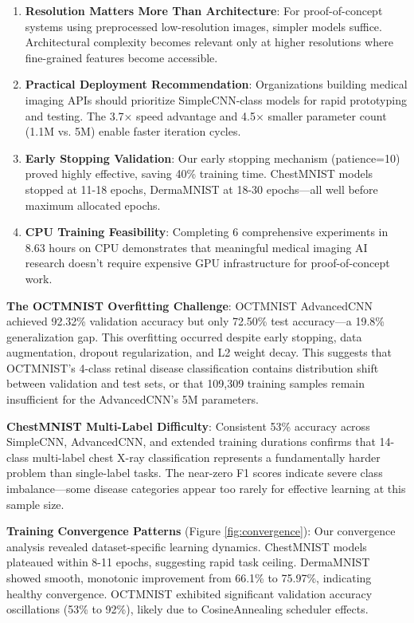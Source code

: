 \documentclass[12pt,a4paper]{article}
\begin{document}
\begin{enumerate}
    \item \textbf{Resolution Matters More Than Architecture}: For proof-of-concept systems using preprocessed low-resolution images, simpler models suffice. Architectural complexity becomes relevant only at higher resolutions where fine-grained features become accessible.
    
    \item \textbf{Practical Deployment Recommendation}: Organizations building medical imaging APIs should prioritize SimpleCNN-class models for rapid prototyping and testing. The 3.7× speed advantage and 4.5× smaller parameter count (1.1M vs. 5M) enable faster iteration cycles.
    
    \item \textbf{Early Stopping Validation}: Our early stopping mechanism (patience=10) proved highly effective, saving 40\% training time. ChestMNIST models stopped at 11-18 epochs, DermaMNIST at 18-30 epochs—all well before maximum allocated epochs.
    
    \item \textbf{CPU Training Feasibility}: Completing 6 comprehensive experiments in 8.63 hours on CPU demonstrates that meaningful medical imaging AI research doesn't require expensive GPU infrastructure for proof-of-concept work.
\end{enumerate}

\textbf{The OCTMNIST Overfitting Challenge}: OCTMNIST AdvancedCNN achieved 92.32\% validation accuracy but only 72.50\% test accuracy—a 19.8\% generalization gap. This overfitting occurred despite early stopping, data augmentation, dropout regularization, and L2 weight decay. This suggests that OCTMNIST's 4-class retinal disease classification contains distribution shift between validation and test sets, or that 109,309 training samples remain insufficient for the AdvancedCNN's 5M parameters.

\textbf{ChestMNIST Multi-Label Difficulty}: Consistent 53\% accuracy across SimpleCNN, AdvancedCNN, and extended training durations confirms that 14-class multi-label chest X-ray classification represents a fundamentally harder problem than single-label tasks. The near-zero F1 scores indicate severe class imbalance—some disease categories appear too rarely for effective learning at this sample size.

\textbf{Training Convergence Patterns} (Figure \ref{fig:convergence}): Our convergence analysis revealed dataset-specific learning dynamics. ChestMNIST models plateaued within 8-11 epochs, suggesting rapid task ceiling. DermaMNIST showed smooth, monotonic improvement from 66.1\% to 75.97\%, indicating healthy convergence. OCTMNIST exhibited significant validation accuracy oscillations (53\% to 92\%), likely due to CosineAnnealing scheduler effects.
\end{document}
